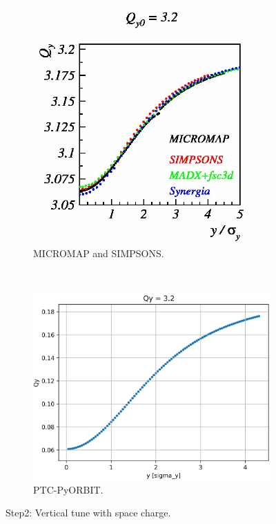 \documentclass[a4paper]{cernatsnote}
\begin{document}
\begin{figure}
        \centering
        \begin{subfigure}{.5\textwidth}
          \centering
          \includegraphics[width=\textwidth]{Step2_tune_y.png}
          \caption{MICROMAP and SIMPSONS.}
          \label{fig:step2V_m}
        \end{subfigure}~~~~~~
        \begin{subfigure}{.5\textwidth}
          \centering
          \includegraphics[width=\textwidth]{Step2_tune_y_PO.png}
          \caption{PTC-PyORBIT.}
          \label{fig:step2V_po}
        \end{subfigure}
        \caption{Step2: Vertical tune with space charge.}
        \label{fig:step2V}
\end{figure}
\end{document}
